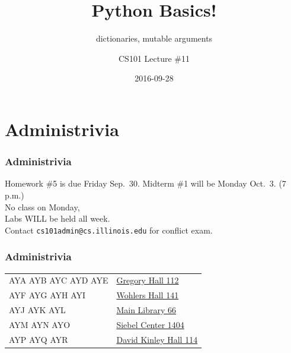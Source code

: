 \documentclass[11pt]{beamer}
\title{Python Basics!}
\subtitle{dictionaries, mutable arguments}
\author{CS101 Lecture \#11}
\date{2016-09-28}
\begin{document}
  \setcounter{showProgressBar}{0}
  \setcounter{showSlideNumbers}{0}

\frame{\titlepage}

\setcounter{framenumber}{0}
\setcounter{showProgressBar}{1}
\setcounter{showSlideNumbers}{1}

\section{Administrivia}

\begin{frame}
  \frametitle{Administrivia}
  \Enlarge

  \begin{itemize}
  \myitem  Homework \#5 is due Friday Sep.\ 30.
  \myitem  Midterm \#1 will be Monday Oct.\ 3.  (7 p.m.) \\ \textcolor{CS101GradBot}{No class on Monday, \\ Labs WILL be held all week. \\ Contact \texttt{cs101admin@cs.illinois.edu} for conflict exam.}
  \end{itemize}
\end{frame}

\begin{frame}
  \frametitle{Administrivia}
  \Enlarge

  \begin{tabular}{ll}
  \rowcolor{CS101Alt}
  AYA AYB AYC AYD AYE & \href{http://ada.fs.illinois.edu/0043.html}{Gregory Hall 112} \\ %
  \rowcolor{CS101White}
  AYF AYG AYH AYI     & \href{http://ada.fs.illinois.edu/0159.html}{Wohlers Hall 141} \\ %
  \rowcolor{CS101Alt}
  AYJ AYK AYL         & \href{http://ada.fs.illinois.edu/0041.html}{Main Library 66} \\ %
  \rowcolor{CS101White}
  AYM AYN AYO         & \href{http://ada.fs.illinois.edu/0563.html}{Siebel Center 1404} \\ %
  \rowcolor{CS101Alt}
  AYP AYQ AYR         & \href{http://ada.fs.illinois.edu/0054.html}{David Kinley Hall 114} \\ %
  \end{tabular}
\end{frame}
\end{document}
